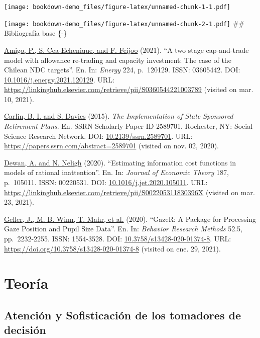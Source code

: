 \documentclass[
]{book}
\begin{document}
\texttt{[image: bookdown-demo\_files/figure-latex/unnamed-chunk-1-1.pdf]}

\texttt{[image: bookdown-demo\_files/figure-latex/unnamed-chunk-2-1.pdf]}
\#\# Bibliografía base \{-\}

\protect\hyperlink{cite-amigo_two_2021}{Amigo, P., S. Cea-Echenique, and F.
Feijoo} (2021). ``A two stage cap-and-trade model
with allowance re-trading and capacity investment: The case of the
Chilean NDC targets''. En. In: \emph{Energy} 224, p.~120129. ISSN: 03605442.
DOI:
\href{https://doi.org/10.1016\%2Fj.energy.2021.120129}{10.1016/j.energy.2021.120129}.
URL:
\url{https://linkinghub.elsevier.com/retrieve/pii/S0360544221003789}
(visited on mar. 10, 2021).

\protect\hyperlink{cite-carlin_implementation_2015}{Carlin, B. I. and S.
Davies} (2015). \emph{The Implementation
of State Sponsored Retirement Plans}. En. SSRN Scholarly Paper ID
2589701. Rochester, NY: Social Science Research Network. DOI:
\href{https://doi.org/10.2139\%2Fssrn.2589701}{10.2139/ssrn.2589701}. URL:
\url{https://papers.ssrn.com/abstract=2589701}
(visited on nov. 02, 2020).

\protect\hyperlink{cite-dewan_estimating_2020}{Dewan, A. and N.
Neligh} (2020). ``Estimating information
cost functions in models of rational inattention''. En. In: \emph{Journal of
Economic Theory} 187, p.~105011. ISSN: 00220531. DOI:
\href{https://doi.org/10.1016\%2Fj.jet.2020.105011}{10.1016/j.jet.2020.105011}.
URL:
\url{https://linkinghub.elsevier.com/retrieve/pii/S002205311830396X}
(visited on mar. 23, 2021).

\protect\hyperlink{cite-geller_gazer_2020}{Geller, J., M. B. Winn, T. Mahr, et
al.} (2020). ``GazeR: A Package for Processing
Gaze Position and Pupil Size Data''. En. In: \emph{Behavior Research Methods}
52.5, pp.~2232-2255. ISSN: 1554-3528. DOI:
\href{https://doi.org/10.3758\%2Fs13428-020-01374-8}{10.3758/s13428-020-01374-8}.
URL:
\url{https://doi.org/10.3758/s13428-020-01374-8}
(visited on ene. 29, 2021).

\hypertarget{teoria}{%
\chapter{Teoría}\label{teoria}}

\hypertarget{atenciuxf3n-y-sofisticaciuxf3n-de-los-tomadores-de-decisiuxf3n}{%
\section{Atención y Sofisticación de los tomadores de decisión}\label{atenciuxf3n-y-sofisticaciuxf3n-de-los-tomadores-de-decisiuxf3n}}
\end{document}
